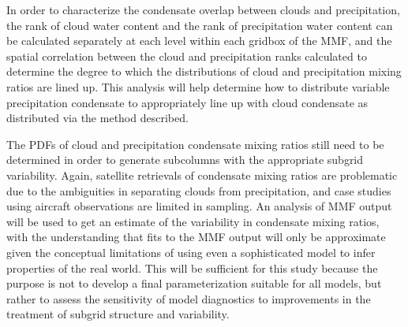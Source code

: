 \documentclass[letter]{article}
\begin{document}

In order to characterize the condensate overlap between clouds and precipitation, the rank of cloud water content and the rank of precipitation water content can be calculated separately at each level within each gridbox of the MMF, and the spatial correlation between the cloud and precipitation ranks calculated to determine the degree to which the distributions of cloud and precipitation mixing ratios are lined up. This analysis will help determine how to distribute variable precipitation condensate to appropriately line up with cloud condensate as distributed via the \cite{raisanen_et_al_2004} method described.

The PDFs of cloud and precipitation condensate mixing ratios still need to be determined in order to generate subcolumns with the appropriate subgrid variability. Again, satellite retrievals of condensate mixing ratios are problematic due to the ambiguities in separating clouds from precipitation, and case studies using aircraft observations are limited in sampling.  An analysis of MMF output will be used to get an estimate of the variability in condensate mixing ratios, with the understanding that fits to the MMF output will only be approximate given the conceptual limitations of using even a sophisticated model to infer properties of the real world. This will be sufficient for this study because the purpose is not to develop a final parameterization suitable for all models, but rather to assess the sensitivity of model diagnostics to improvements in the treatment of subgrid structure and variability.
\end{document}

